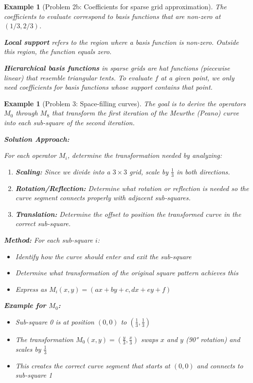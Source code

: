 \documentclass[11pt,a4paper]{article}
\newtheorem{example}[theorem]{Example}
\begin{document}
\begin{example}[Problem 2b: Coefficients for sparse grid approximation]
    The coefficients to evaluate correspond to basis functions that are non-zero at $(1/3, 2/3)$.

    \textbf{Local support} refers to the region where a basis function is non-zero. Outside this region, the function equals zero.

    \textbf{Hierarchical basis functions} in sparse grids are hat functions (piecewise linear) that resemble triangular tents. To evaluate $f$ at a given point, we only need coefficients for basis functions whose support contains that point.

\end{example}

\begin{example}[Problem 3: Space-filling curves]

The goal is to derive the operators $M_0$ through $M_8$ that transform the first iteration of the Meurthe (Peano) curve into each sub-square of the second iteration.

\textbf{Solution Approach:}

For each operator $M_i$, determine the transformation needed by analyzing:

\begin{enumerate}
    \item \textbf{Scaling:} Since we divide into a $3 \times 3$ grid, scale by $\frac{1}{3}$ in both directions.
    
    \item \textbf{Rotation/Reflection:} Determine what rotation or reflection is needed so the curve segment connects properly with adjacent sub-squares.
    
    \item \textbf{Translation:} Determine the offset to position the transformed curve in the correct sub-square.
\end{enumerate}

\textbf{Method:} For each sub-square $i$:
\begin{itemize}
    \item Identify how the curve should enter and exit the sub-square
    \item Determine what transformation of the original square pattern achieves this
    \item Express as $M_i(x,y) = (ax + by + c, dx + ey + f)$
\end{itemize}

\textbf{Example for $M_0$:}
\begin{itemize}
    \item Sub-square 0 is at position $(0,0)$ to $(\frac{1}{3}, \frac{1}{3})$
    \item The transformation $M_0(x,y) = (\frac{y}{3}, \frac{x}{3})$ swaps $x$ and $y$ (90° rotation) and scales by $\frac{1}{3}$
    \item This creates the correct curve segment that starts at $(0,0)$ and connects to sub-square 1
\end{itemize}

\end{example}
\end{document}
